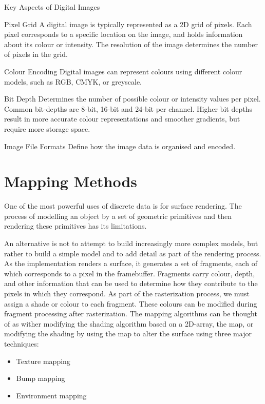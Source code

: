\documentclass[../COS3712_Notes.tex]{subfiles}
\begin{document}
      \begin{sidenote}{Key Aspects of Digital Images}
        $ $\vspace{-1em}
        \begin{descriptimize}
          \item[Pixel Grid] A digital image is typically represented as a 2D grid of pixels.
            Each pixel corresponds to a specific location on the image, and holds information
            about its colour or intensity.
            The resolution of the image determines the number of pixels in the grid.
          \item[Colour Encoding] Digital images can represent colours using different colour models,
            such as RGB, CMYK, or greyscale.
          \item[Bit Depth] Determines the number of possible colour or intensity values
            per pixel.
            Common bit-depths are 8-bit, 16-bit and 24-bit per channel.
            Higher bit depths result in more accurate colour representations and smoother gradients,
            but require more storage space.
          \item[Image File Formats] Define how the image data is organised and encoded.
        \end{descriptimize}
      \end{sidenote}

    \section{Mapping Methods}
      One of the most powerful uses of discrete data is for surface rendering.
      The process of modelling an object by a set of geometric primitives and then rendering
      these primitives has its limitations.

      An alternative is not to attempt to build increasingly more complex models,
      but rather to build a simple model and to add detail as part of the rendering process.
      As the implementation renders a surface, it generates a set of fragments,
      each of which corresponds to a pixel in the framebuffer.
      Fragments carry colour, depth, and other information that can be used to determine
      how they contribute to the pixels in which they correspond.
      As part of the rasterization process, we must assign a shade or colour to each fragment.
      These colours can be modified during fragment processing after rasterization.
      The mapping algorithms can be thought of as wither modifying the shading algorithm
      based on a 2D-array, the map, or modifying the shading by using the map to alter the
      surface using three major techniques:
      \begin{itemize}[nosep]
        \item Texture mapping
        \item Bump mapping
        \item Environment mapping
      \end{itemize}
\end{document}
